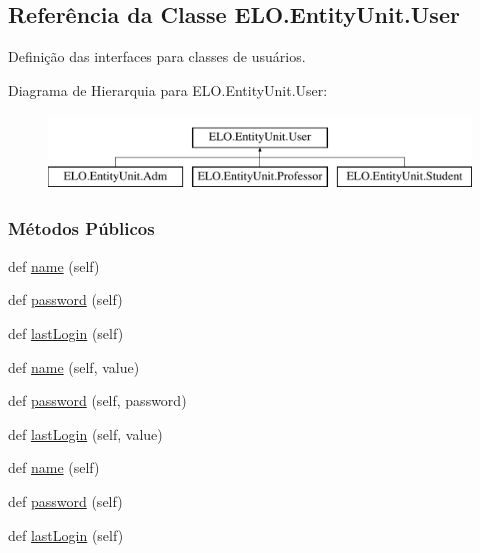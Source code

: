 \hypertarget{classELO_1_1EntityUnit_1_1User}{}\subsection{Referência da Classe E\+L\+O.\+Entity\+Unit.\+User}
\label{classELO_1_1EntityUnit_1_1User}


Definição das interfaces para classes de usuários.  


Diagrama de Hierarquia para E\+L\+O.\+Entity\+Unit.\+User\+:\begin{figure}[H]
\begin{center}
\leavevmode
\includegraphics[height=2.000000cm]{dd/d09/classELO_1_1EntityUnit_1_1User}
\end{center}
\end{figure}
\subsubsection*{Métodos Públicos}
\begin{DoxyCompactItemize}
\item 
def \hyperlink{classELO_1_1EntityUnit_1_1User_af1043e061530216672b7b05c60ac8aad}{name} (self)
\item 
def \hyperlink{classELO_1_1EntityUnit_1_1User_afa4958003d3a9ad26ff67a5f05fc2d8b}{password} (self)
\item 
def \hyperlink{classELO_1_1EntityUnit_1_1User_a7cd333ecd573e3ec50229729dc04ba3c}{last\+Login} (self)
\item 
def \hyperlink{classELO_1_1EntityUnit_1_1User_a3fecdcb461b852060f9aba344696e6b6}{name} (self, value)
\item 
def \hyperlink{classELO_1_1EntityUnit_1_1User_afb204f199e1e59d794d58ee9b7b87604}{password} (self, password)
\item 
def \hyperlink{classELO_1_1EntityUnit_1_1User_ae22c4e9cd29ccfce2baaeaf7d5471a56}{last\+Login} (self, value)
\item 
def \hyperlink{classELO_1_1EntityUnit_1_1User_af1043e061530216672b7b05c60ac8aad}{name} (self)
\item 
def \hyperlink{classELO_1_1EntityUnit_1_1User_afa4958003d3a9ad26ff67a5f05fc2d8b}{password} (self)
\item 
def \hyperlink{classELO_1_1EntityUnit_1_1User_a7cd333ecd573e3ec50229729dc04ba3c}{last\+Login} (self)
\end{DoxyCompactItemize}


